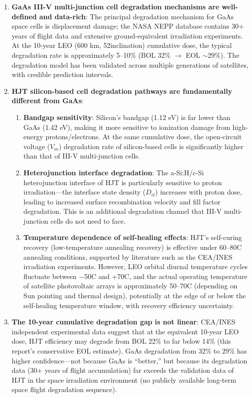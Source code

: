 \begin{enumerate}[leftmargin=*]
    \item \textbf{GaAs III-V multi-junction cell degradation mechanisms are well-defined and data-rich}: The principal degradation mechanism for GaAs space cells is displacement damage; the NASA NEPP database contains 30+ years of flight data and extensive ground-equivalent irradiation experiments. At the 10-year LEO (600 km, 52\degree inclination) cumulative dose, the typical degradation rate is approximately 5--10\% (BOL 32\% $\to$ EOL $\sim$29\%). The degradation model has been validated across multiple generations of satellites, with credible prediction intervals.
    \item \textbf{HJT silicon-based cell degradation pathways are fundamentally different from GaAs}:
    \begin{enumerate}
        \item \textbf{Bandgap sensitivity}: Silicon's bandgap (1.12 eV) is far lower than GaAs (1.42 eV), making it more sensitive to ionization damage from high-energy protons/electrons. At the same cumulative dose, the open-circuit voltage ($V_{oc}$) degradation rate of silicon-based cells is significantly higher than that of III-V multi-junction cells.
        \item \textbf{Heterojunction interface degradation}: The a-Si:H/c-Si heterojunction interface of HJT is particularly sensitive to proton irradiation---the interface state density ($D_{it}$) increases with proton dose, leading to increased surface recombination velocity and fill factor degradation. This is an additional degradation channel that III-V multi-junction cells do not need to face.
        \item \textbf{Temperature dependence of self-healing effects}: HJT's self-curing recovery (low-temperature annealing recovery) is effective under 60--80\degree C annealing conditions, supported by literature such as the CEA/INES irradiation experiments. However, LEO orbital diurnal temperature cycles fluctuate between $-$50\degree C and +70\degree C, and the actual operating temperature of satellite photovoltaic arrays is approximately 50--70\degree C (depending on Sun pointing and thermal design), potentially at the edge of or below the self-healing temperature window, with recovery efficiency uncertainty.
    \end{enumerate}
    \item \textbf{The 10-year cumulative degradation gap is not linear}: CEA/INES independent experimental data suggest that at the equivalent 10-year LEO dose, HJT efficiency may degrade from BOL 22\% to far below 14\% (this report's conservative EOL estimate). GaAs degradation from 32\% to 29\% has higher confidence---not because GaAs is ``better,'' but because its degradation data (30+ years of flight accumulation) far exceeds the validation data of HJT in the space irradiation environment (no publicly available long-term space flight degradation sequence).

\end{enumerate}
